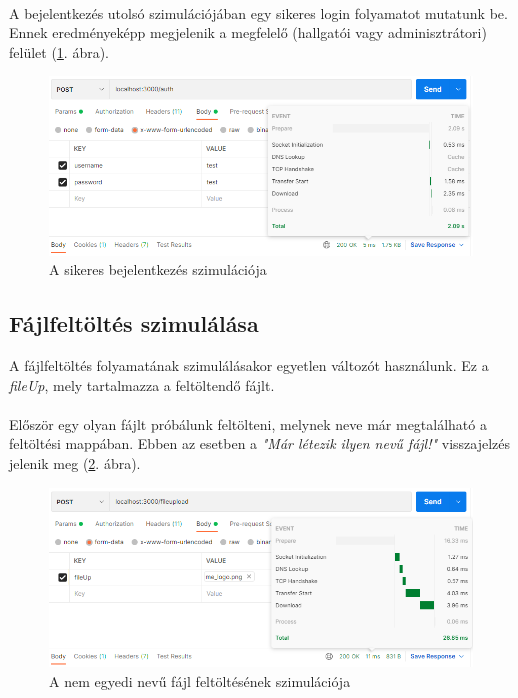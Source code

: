 \\

A bejelentkezés utolsó szimulációjában egy sikeres login folyamatot mutatunk be. Ennek eredményeképp megjelenik a megfelelő (hallgatói vagy adminisztrátori) felület (\ref{fig:loginSuccess}. ábra).

\begin{figure}[h]
	\centering
		\includegraphics[width=15truecm, height=7truecm]{images/loginSuccess.png}
	\caption{A sikeres bejelentkezés szimulációja}
	\label{fig:loginSuccess}
\end{figure}


\subsection{Fájlfeltöltés szimulálása}

A fájlfeltöltés folyamatának szimulálásakor egyetlen változót használunk. Ez a \textit{fileUp}, mely tartalmazza a feltöltendő fájlt.\\

\\

Először egy olyan fájlt próbálunk feltölteni, melynek neve már megtalálható a feltöltési mappában. Ebben az esetben a \textit{"Már létezik ilyen nevű fájl!"} visszajelzés jelenik meg (\ref{fig:uploadFileExists}. ábra).

\begin{figure}[h]
	\centering
		\includegraphics[width=15truecm, height=7truecm]{images/uploadFileExists.png}
	\caption{A nem egyedi nevű fájl feltöltésének szimulációja}
	\label{fig:uploadFileExists}
\end{figure}

